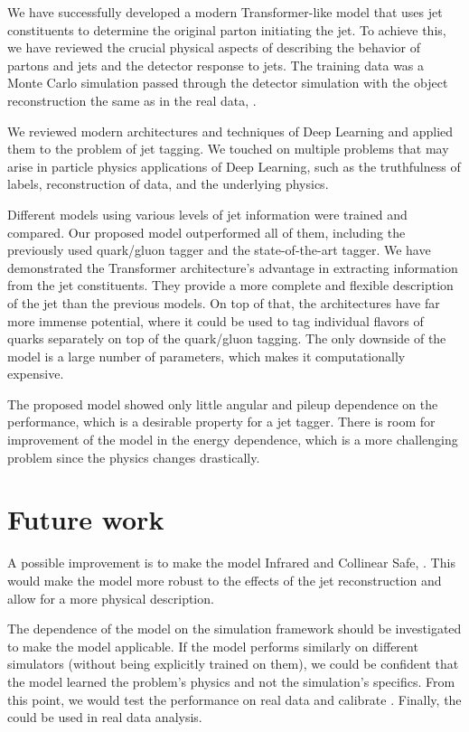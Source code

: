 

We have successfully developed a modern Transformer-like model that uses jet constituents to determine the original parton initiating the jet.
To achieve this, we have reviewed the crucial physical aspects of \QCD describing the behavior of partons and jets and the detector response to jets.
The training data was a Monte Carlo simulation passed through the detector simulation with the object reconstruction the same as in the real data, .

We reviewed modern architectures and techniques of Deep Learning and applied them to the problem of jet tagging.
We touched on multiple problems that may arise in particle physics applications of Deep Learning, such as the truthfulness of labels, reconstruction of data, and the underlying physics.

Different models using various levels of jet information were trained and compared.
Our proposed \depart model outperformed all of them, including the previously used quark/gluon tagger and the state-of-the-art \ParT tagger.
We have demonstrated the Transformer architecture's advantage in extracting information from the jet constituents.
They provide a more complete and flexible description of the jet than the previous models.
On top of that, the \trans architectures have far more immense potential, where it could be used to tag individual flavors of quarks separately on top of the quark/gluon tagging. 
The only downside of the model is a large number of parameters, which makes it computationally expensive.

The proposed model showed only little angular and pileup dependence on the performance, which is a desirable property for a jet tagger. 
There is room for improvement of the model in the energy dependence, which is a more challenging problem since the physics changes drastically.

\section{Future work}
A possible improvement is to make the model Infrared and Collinear Safe, .
This would make the model more robust to the effects of the jet reconstruction and allow for a more physical description.

The dependence of the model on the simulation framework should be investigated to make the model applicable. 
If the model performs similarly on different simulators (without being explicitly trained on them), we could be confident that the model learned the problem's physics and not the simulation's specifics. 
From this point, we would test the performance on real data and calibrate \MC.
Finally, the \depart could be used in real data analysis.